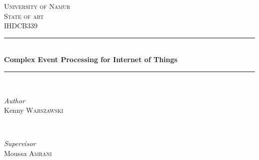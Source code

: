 \documentclass[11pt]{article}
\begin{document}

\begin{titlepage} %
	\newcommand{\HRule}{\rule{\linewidth}{0.5mm}} %
	
	\center %
	
	
	\textsc{\LARGE University of Namur}\\[1.5cm] %
	
	\textsc{\Large State of art}\\[0.5cm] %
	
	\textsc{\large IHDCB339}\\[0.5cm] %
	
	
	\HRule\\[0.4cm]
	
	{\huge\bfseries Complex Event Processing for Internet of Things}\\[0.4cm] %
	
	\HRule\\[1.5cm]
	
	
	\begin{minipage}{0.4\textwidth}
		\begin{flushleft}
			\large
			\textit{Author}\\
			Kenny \textsc{Warszawski} %
		\end{flushleft}
	\end{minipage}
	~
	\begin{minipage}{0.4\textwidth}
		\begin{flushright}
			\large
			\textit{Supervisor}\\
			Moussa \textsc{Amrani} %
		\end{flushright}
	\end{minipage}
	

\end{titlepage}
\end{document}
